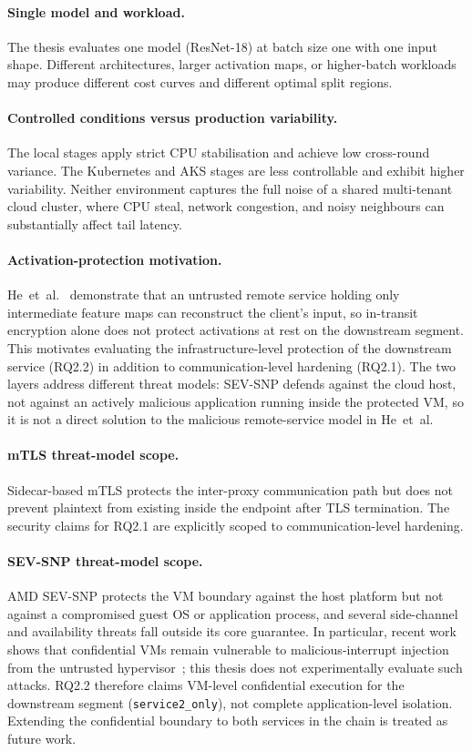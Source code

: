 \paragraph{Single model and workload.}
The thesis evaluates one model (ResNet-18) at batch size one with one input
shape. Different architectures, larger activation maps, or higher-batch
workloads may produce different cost curves and different optimal split
regions.

\paragraph{Controlled conditions versus production variability.}
The local stages apply strict CPU stabilisation and achieve low cross-round
variance. The Kubernetes and AKS stages are less controllable and exhibit
higher variability. Neither environment captures the full noise of a shared
multi-tenant cloud cluster, where CPU steal, network congestion, and noisy
neighbours can substantially affect tail latency.

\paragraph{Activation-protection motivation.}
He~et~al.\ \cite{he2021_attacking_collaborative} demonstrate that an untrusted
remote service holding only intermediate feature maps can reconstruct the
client's input, so in-transit encryption alone does not protect activations
at rest on the downstream segment. This motivates evaluating the
infrastructure-level protection of the downstream service (RQ2.2) in
addition to communication-level hardening (RQ2.1). The two layers address
different threat models: SEV-SNP defends against the cloud host, not against
an actively malicious application running inside the protected VM, so it is
not a direct solution to the malicious remote-service model in
He~et~al.

\paragraph{mTLS threat-model scope.}
Sidecar-based mTLS protects the inter-proxy communication path but does not
prevent plaintext from existing inside the endpoint after TLS termination.
The security claims for RQ2.1 are explicitly scoped to communication-level
hardening.

\paragraph{SEV-SNP threat-model scope.}
AMD SEV-SNP protects the VM boundary against the host platform but not
against a compromised guest OS or application process, and several
side-channel and availability threats fall outside its core guarantee. In
particular, recent work shows that confidential VMs remain vulnerable to
malicious-interrupt injection from the untrusted
hypervisor~\cite{schluter2024_heckler}; this thesis does not experimentally
evaluate such attacks. RQ2.2 therefore claims VM-level confidential
execution for the downstream segment (\texttt{service2\_only}), not
complete application-level isolation. Extending the confidential boundary
to both services in the chain is treated as future work.


